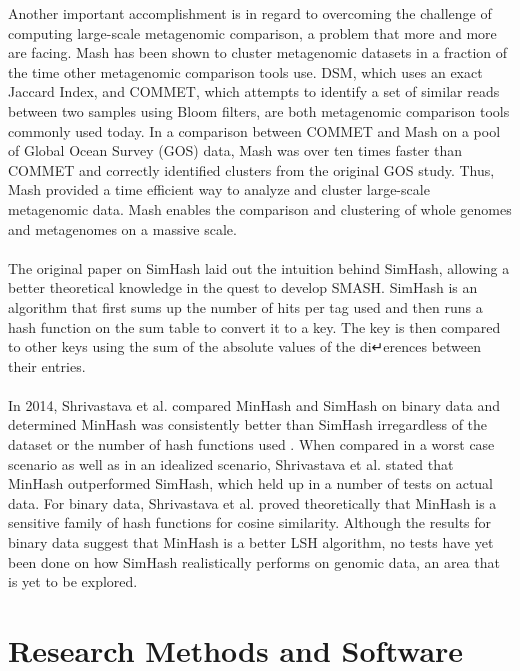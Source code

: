 \documentclass[12pt, letterpaper]{article}
\begin{document}
Another important accomplishment is in regard to overcoming the challenge of computing large-scale metagenomic comparison, a problem that more and more are facing. Mash has been shown to cluster metagenomic datasets in a fraction of the time other metagenomic comparison tools use. DSM, which uses an exact Jaccard Index, and COMMET, which attempts to identify a set of similar reads between two samples using Bloom filters, are both metagenomic comparison tools commonly used today. In a comparison between COMMET and Mash on a pool of Global Ocean Survey (GOS) data, Mash was over ten times faster than COMMET and correctly identified clusters from the original GOS study. Thus, Mash provided a time efficient way to analyze and cluster large-scale metagenomic data. Mash enables the comparison and clustering of whole genomes and metagenomes on a massive scale. \\ \\
The original paper on SimHash laid out the intuition behind SimHash, allowing a better theoretical knowledge in the quest to develop SMASH.\cite{simhash} SimHash is an algorithm that first sums up the number of hits per tag used and then runs a hash function on the sum table to convert it to a key. The key is then compared to other keys using the sum of the absolute values of the di↵erences between their entries. \\ \\
In 2014, Shrivastava et al. compared MinHash and SimHash on binary data and determined MinHash was consistently better than SimHash irregardless of the dataset or the number of hash functions used \cite{SimvsMin}. When compared in a worst case scenario as well as in an idealized scenario, Shrivastava et al. stated that MinHash outperformed SimHash, which held up in a number of tests on actual data. For binary data, Shrivastava et al. proved theoretically that MinHash is a sensitive family of hash functions for cosine similarity. Although the results for binary data suggest that MinHash is a better LSH algorithm, no tests have yet been done on how SimHash realistically performs on genomic data, an area that is yet to be explored.

\section{Research Methods and Software}
\end{document}
